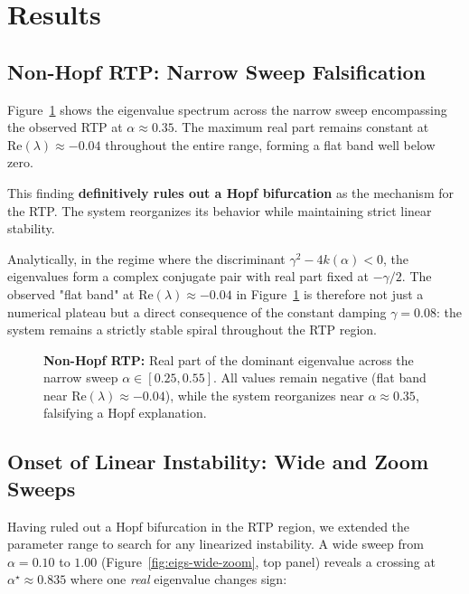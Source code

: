 \documentclass[11pt,twocolumn]{article}
\begin{document}
\section{Results}

\subsection{Non-Hopf RTP: Narrow Sweep Falsification}

Figure~\ref{fig:eigs-narrow} shows the eigenvalue spectrum across the narrow sweep encompassing the observed
RTP at $\alpha \approx 0.35$. The maximum real part remains constant at $\mathrm{Re}(\lambda) \approx -0.04$
throughout the entire range, forming a flat band well below zero.

This finding \textbf{definitively rules out a Hopf bifurcation} as the mechanism for the RTP. The system
reorganizes its behavior while maintaining strict linear stability.

Analytically, in the regime where the discriminant $\gamma^2 - 4k(\alpha) < 0$, the eigenvalues form a complex conjugate pair with real part fixed at $-\gamma/2$. The observed "flat band" at $\mathrm{Re}(\lambda)\approx -0.04$ in Figure~\ref{fig:eigs-narrow} is therefore not just a numerical plateau but a direct consequence of the constant damping $\gamma=0.08$: the system remains a strictly stable spiral throughout the RTP region.

\begin{figure}[t]
  \centering
  
  \caption{%
  \textbf{Non-Hopf RTP:} Real part of the dominant eigenvalue across the narrow sweep
  $\alpha\in[0.25,0.55]$. All values remain negative (flat band near $\mathrm{Re}(\lambda)\approx -0.04$),
  while the system reorganizes near $\alpha\approx0.35$, falsifying a Hopf explanation.
  }
  \label{fig:eigs-narrow}
\end{figure}

\subsection{Onset of Linear Instability: Wide and Zoom Sweeps}

Having ruled out a Hopf bifurcation in the RTP region, we extended the parameter range to search for any
linearized instability. A wide sweep from $\alpha = 0.10$ to $1.00$ (Figure~\ref{fig:eigs-wide-zoom}, top panel)
reveals a crossing at $\alpha^\star \approx 0.835$ where one \emph{real} eigenvalue changes sign:
\end{document}
